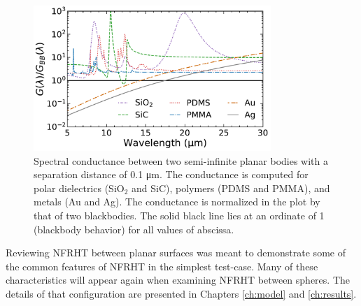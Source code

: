 \begin{figure}
\centering
\includegraphics[width=0.8\textwidth]{./Figures/NFRHT_planeplane_spectral_fixedgap.pdf}
\caption{\label{fig:PlanePlane_spectral_onegap}Spectral conductance between two semi-infinite planar bodies with a separation distance of 0.1 \si{\micro\meter}. The conductance is computed for polar dielectrics (SiO$_{2}$ and SiC), polymers (PDMS and PMMA), and metals (Au and Ag). The conductance is normalized in the plot by that of two blackbodies. The solid black line lies at an ordinate of 1 (blackbody behavior) for all values of abscissa.}
\end{figure}

Reviewing NFRHT between planar surfaces was meant to demonstrate some of the common features of NFRHT in the simplest test-case. Many of these characteristics will appear again when examining NFRHT between spheres. The details of that configuration are presented in Chapters \ref{ch:model} and \ref{ch:results}.